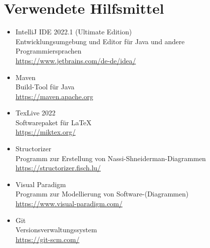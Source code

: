 \chapter{Verwendete Hilfsmittel}\label{ch:verwendete-hilfsmittel}

\begin{itemize}
    \item IntelliJ IDE 2022.1 (Ultimate Edition)\\ Entwicklungsumgebung und Editor für Java und andere Programmiersprachen \\\url{https://www.jetbrains.com/de-de/idea/}
    \item Maven\\Build-Tool für Java\\\url{https://maven.apache.org}
    \item TexLive 2022\\Softwarepaket für \LaTeX\\\url{https://miktex.org/}
    \item Structorizer\\Programm zur Erstellung von Nassi-Shneiderman-Diagrammen \\\url{https://structorizer.fisch.lu/}
    \item Visual Paradigm\\Programm zur Modellierung von Software-(Diagrammen) \\\url{https://www.visual-paradigm.com/}
    \item Git\\Versionsverwaltungssystem \\\url{https://git-scm.com/}
\end{itemize}